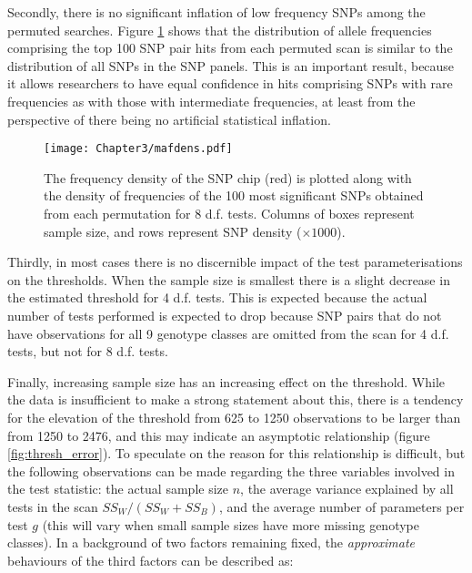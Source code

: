 Secondly, there is no significant inflation of low frequency SNPs among the permuted searches. Figure \ref{fig:mafdens} shows that the distribution of allele frequencies comprising the top 100 SNP pair hits from each permuted scan is similar to the distribution of all SNPs in the SNP panels. This is an important result, because it allows researchers to have equal confidence in hits comprising SNPs with rare frequencies as with those with intermediate frequencies, at least from the perspective of there being no artificial statistical inflation.

\begin{figure}
\begin{center}
\texttt{[image: Chapter3/mafdens.pdf]}
\caption[Observed vs expected SNP frequency densities]{The frequency density of the SNP chip (red) is plotted along with the density of frequencies of the 100 most significant SNPs obtained from each permutation for 8 d.f. tests. Columns of boxes represent sample size, and rows represent SNP density ($\times 1000$).}
\label{fig:mafdens}
\end{center}
\end{figure}

Thirdly, in most cases there is no discernible impact of the test parameterisations on the thresholds. When the sample size is smallest there is a slight decrease in the estimated threshold for 4 d.f. tests. This is expected because the actual number of tests performed is expected to drop because SNP pairs that do not have observations for all 9 genotype classes are omitted from the scan for 4 d.f. tests, but not for 8 d.f. tests.

Finally, increasing sample size has an increasing effect on the threshold. While the data is insufficient to make a strong statement about this, there is a tendency for the elevation of the threshold from 625 to 1250 observations to be larger than from 1250 to 2476, and this may indicate an asymptotic relationship (figure \ref{fig:thresh_error}). To speculate on the reason for this relationship is difficult, but the following observations can be made regarding the three variables involved in the test statistic: the actual sample size $n$, the average variance explained by all tests in the scan $SS_{W} / (SS_{W}+SS_{B})$, and the average number of parameters per test $g$ (this will vary when small sample sizes have more missing genotype classes). In a background of two factors remaining fixed, the \emph{approximate} behaviours of the third factors can be described as:


